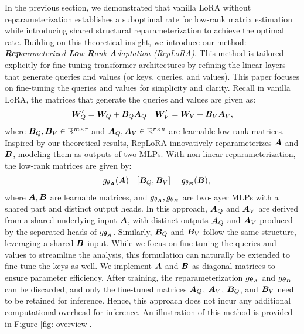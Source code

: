 In the previous section, we demonstrated that vanilla LoRA without reparameterization establishes a suboptimal rate for low-rank matrix estimation while introducing shared structural reparameterization to achieve the optimal rate. Building on this theoretical insight, we introduce our method: \textit{\textbf{Rep}arameterized \textbf{Lo}w-\textbf{R}ank \textbf{A}daptation (RepLoRA)}. This method is tailored explicitly for fine-tuning transformer architectures by refining the linear layers that generate queries and values (or keys, queries, and values). This paper focuses on fine-tuning the queries and values for simplicity and clarity. Recall in vanilla LoRA, the matrices that generate the queries and values are given as:
\begin{align} 
\bm{W}'_Q = \bm{W}_Q + {\bm B}_Q {\bm A}_Q &&  \bm{W}'_V = \bm{W}_V + {\bm B}_V {\bm A}_V,
\end{align}
where ${\bm B}_Q, {\bm B}_V \in \mathbb{R}^{m \times r}$ and ${\bm A}_Q, {\bm A}_V \in \mathbb{R}^{r \times n}$ are learnable low-rank matrices. Inspired by our theoretical results, RepLoRA innovatively reparameterizes ${\bm A}$ and ${\bm B}$, modeling them as outputs of two MLPs. With non-linear reparameterization, the low-rank matrices are given by: 
\begin{align}
    [\Abm_Q, \Abm_V]  = g_{\theta_\Abm}({\Abm}) && [\Bbm_Q, \Bbm_V] = g_{\theta_\Bbm}({\Bbm}),
\end{align}
where ${\bm A}, {\bm B}$ are learnable matrices, and $g_{\theta_{\bm A}}, g_{\theta_{\bm B}}$ are two-layer MLPs with a shared part and distinct output heads. In this approach, ${\bm A}_Q$ and ${\bm A}_V$ are derived from a shared underlying input ${\bm A}$, with distinct outputs  ${\bm A}_Q$ and ${\bm A}_V$ produced by the separated heads of $g_{{\bm{\theta}}_{\bm A}}$. Similarly, ${\bm B}_Q$ and ${\bm B}_V$ follow the same structure, leveraging a shared ${\bm B}$ input. While we focus on fine-tuning the queries and values to streamline the analysis, this formulation can naturally be extended to fine-tune the keys as well. We implement ${\bm A}$ and ${\bm B}$ as diagonal matrices to ensure parameter efficiency. After training, the reparameterization $g_{{\bm{\theta}}_{\bm A}}$ and $g_{{\bm{\theta}}_{\bm B}}$ can be discarded, and only the fine-tuned matrices ${\bm A}_Q$, ${\bm A}_V$, ${\bm B}_Q$, and ${\bm B}_V$ need to be retained for inference. Hence, this approach does not incur any additional computational overhead for inference. An illustration of this method is provided in Figure \ref{fig: overview}. 




